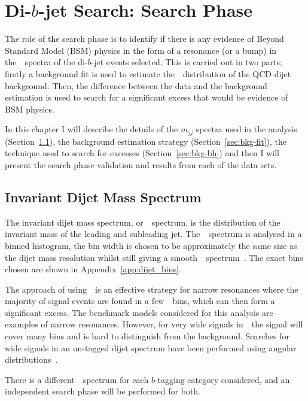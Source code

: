 \chapter{Di-$b$-jet Search: Search Phase}
\label{sec:bkg}

The role of the search phase is to identify if there is any evidence of Beyond Standard Model (BSM)
physics in the form of a resonance (or a bump) in the~\mjj~spectra of the di-$b$-jet events selected.
This is carried out in two parts; firstly a background fit is used to estimate
the~\mjj~distribution of the QCD dijet background.
Then, the difference between the data and the background estimation is used 
to search for a significant excess that would be evidence of BSM physics.

In this chapter I will describe
the details of the $m_{jj}$ spectra used in the analysis (Section~\ref{sec:bkg-mjj}),
the background estimation strategy (Section~\ref{sec:bkg-fit}),
the technique used to search for excesses (Section~\ref{sec:bkg-bh})
and then I will present the search phase validation and results from each of the data sets.

\section{Invariant Dijet Mass Spectrum}
\label{sec:bkg-mjj}

The invariant dijet mass spectrum, or~\mjj~spectrum,
is the distribution of the invariant mass of the leading and subleading jet.
The~\mjj~spectrum is analysed in a binned histogram,
the bin width is chosen to be approximately the same size as the dijet mass resolution
whilst still giving a smooth~\mjj~spectrum~\cite{dijet-mori16_int}.
The exact bins chosen are shown in Appendix~\ref{app:dijet_bins}.

The approach of using~\mjj~is an effective strategy for narrow resonances
where the majority of signal events are found in a few~\mjj~bins,
which can then form a significant excess.
The benchmark models considered for this analysis are examples of narrow resonances.
However, for very wide signals in~\mjj~the signal will cover many bins and is hard to distinguish from the background.
Searches for wide signals in an un-tagged dijet spectrum have been performed using angular distributions~\cite{dijet-mori16_paper}.

There is a different~\mjj~spectrum for each
$b$-tagging category considered,
and an independent search phase will be performed for both.

